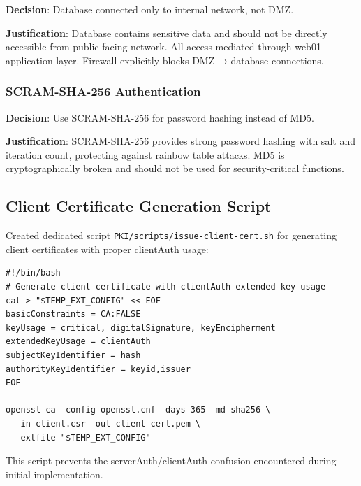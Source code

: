 \textbf{Decision}: Database connected only to internal network, not DMZ.

\textbf{Justification}: Database contains sensitive data and should not be directly accessible from public-facing network. All access mediated through web01 application layer. Firewall explicitly blocks DMZ → database connections.

\subsubsection{SCRAM-SHA-256 Authentication}

\textbf{Decision}: Use SCRAM-SHA-256 for password hashing instead of MD5.

\textbf{Justification}: SCRAM-SHA-256 provides strong password hashing with salt and iteration count, protecting against rainbow table attacks. MD5 is cryptographically broken and should not be used for security-critical functions.

\subsection{Client Certificate Generation Script}

Created dedicated script \texttt{PKI/scripts/issue-client-cert.sh} for generating client certificates with proper clientAuth usage:

\begin{verbatim}
#!/bin/bash
# Generate client certificate with clientAuth extended key usage
cat > "$TEMP_EXT_CONFIG" << EOF
basicConstraints = CA:FALSE
keyUsage = critical, digitalSignature, keyEncipherment
extendedKeyUsage = clientAuth
subjectKeyIdentifier = hash
authorityKeyIdentifier = keyid,issuer
EOF

openssl ca -config openssl.cnf -days 365 -md sha256 \
  -in client.csr -out client-cert.pem \
  -extfile "$TEMP_EXT_CONFIG"
\end{verbatim}

This script prevents the serverAuth/clientAuth confusion encountered during initial implementation.
